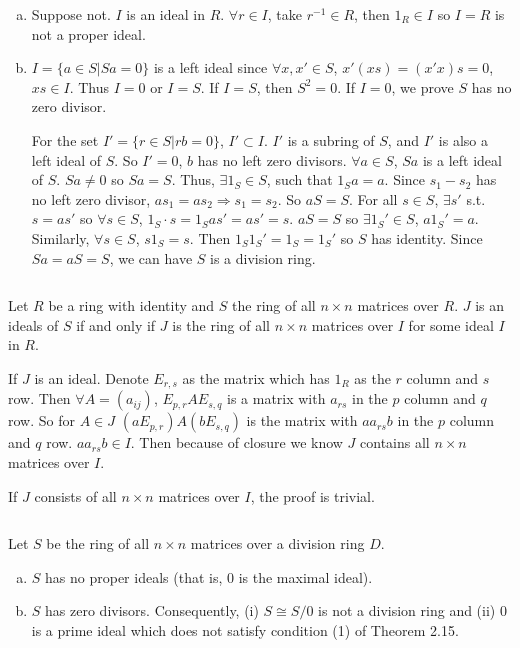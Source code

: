 \begin{answer}
    \begin{enumerate}[(a)]
        \item Suppose not. $I$ is an ideal in $R$. $\forall r\in I$, take $r^{-1}\in R$, then $1_{R}\in I$ so $I=R$ is not a  proper ideal.
        \item $I=\{a\in S|Sa=0\}$ is a left ideal since $\forall x,x'\in S$, $x'(xs)=(x'x)s=0$, $xs\in I$. Thus $I=0$ or $I=S$. If $I=S$, then $S^{2}=0$. If $I=0$, we prove $S$ has no zero divisor.
        
        For the set $I'=\{r\in S|rb=0\}$, $I'\subset I$. $I'$ is a subring of $S$, and $I'$ is also a left ideal of $S$. So $I'=0$, $b$ has no left zero divisors. $\forall a\in S$, $Sa$ is a left ideal of $S$. $Sa\neq 0$ so $Sa=S$. Thus, $\exists 1_{S}\in S$, such that $1_{S}a=a$. Since $s_{1}-s_{2}$ has no left zero divisor, $as_{1}=as_{2}\Rightarrow s_{1}=s_{2}$. So $aS=S$. For all $s\in S$, $\exists s'$ s.t. $s=as'$ so $\forall s\in S$, $1_{S}\cdot s=1_{S}as'=as'=s$. $aS=S$ so $\exists 1_{S}'\in S$, $a1_{S}'=a$. Similarly, $\forall s\in S$, $s1_{S}=s$. Then $1_{S}1_{S}'=1_{S}=1_{S}'$ so $S$ has identity. Since $Sa=aS=S$, we can have $S$ is a division ring.
    \end{enumerate}
\end{answer}

$$ $$

\begin{ex}
    Let $R$ be a ring with identity and $S$ the ring of all $n\times n$ matrices over $R$. $J$ is an ideals of $S$ if and only if $J$ is the ring of all $n\times n$ matrices over $I$ for some ideal $I$ in $R$.
\end{ex}

\begin{answer}
    If $J$ is an ideal. Denote $E_{r,s}$ as the matrix which has $1_{R}$ as the $r$ column and $s$ row. Then $\forall A=(a_{ij})$, $E_{p,r}AE_{s,q}$ is a matrix with $a_{rs}$ in the $p$ column and  $q$ row. So for $A\in J$ $(aE_{p,r})A(bE_{s,q})$ is the matrix with $aa_{rs}b$ in the $p$ column and  $q$ row. $aa_{rs}b\in I$. Then because of closure we know $J$ contains all $n\times n$ matrices over $I$. 

    If $J$ consists of all $n\times n$ matrices over $I$, the proof is trivial.
\end{answer}

$$ $$

\begin{ex}
    Let $S$ be the ring of all $n\times n$ matrices over a division ring $D$.
    \begin{enumerate}[(a)]
        \item $S$ has no proper ideals (that is, 0 is the maximal ideal).
        \item $S$ has zero divisors. Consequently, (i) $S\cong S /0$ is not a division ring and (ii) 0 is a prime ideal which does not satisfy condition (1) of Theorem 2.15.
    \end{enumerate}
\end{ex}

